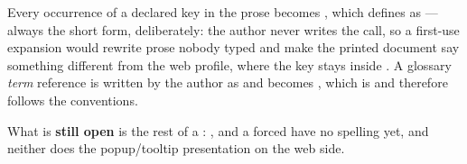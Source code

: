 \documentclass[a4paper,twoside]{article}
\begin{document}
Every occurrence of a declared key in the prose becomes , which
 defines as  --- always the short form, deliberately: the
author never writes the call, so a first-use expansion would rewrite prose
nobody typed and make the printed document say something different from the web
profile, where the key stays inside . A glossary \emph{term} reference is
written by the author as  and becomes , which is  and
therefore follows the  conventions.

What is \textbf{still open} is the rest of a : , 
and a forced  have no spelling yet, and neither does the popup/tooltip
presentation on the web side.
\end{document}
